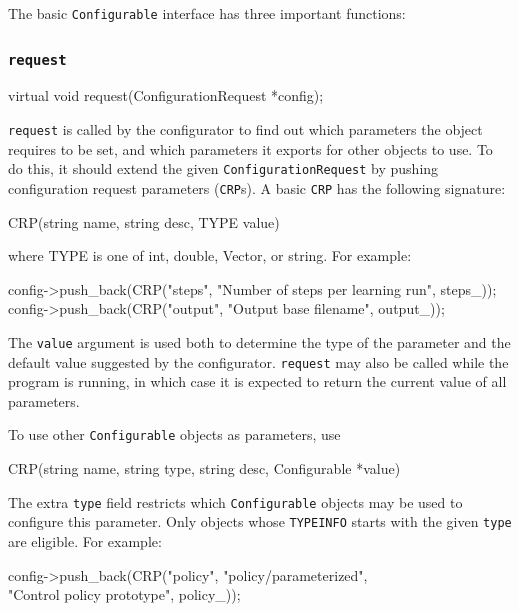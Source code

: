 \documentclass{article}
\newcommand{\txt}[1]{\texttt{#1}}
\newenvironment{code}{\alltt}{\endalltt}
\begin{document}
The basic \txt{Configurable} interface has three important functions:

\subsubsection{\txt{request}}
\begin{code}
virtual void request(ConfigurationRequest *config);
\end{code}

\txt{request} is called by the configurator to find out which parameters the
object requires to be set, and which parameters it exports for other objects
to use. To do this, it should extend the given \txt{ConfigurationRequest}
by pushing configuration request parameters (\txt{CRP}s). A basic \txt{CRP}
has the following signature:

\begin{code}
CRP(string name, string desc, TYPE value)
\end{code}

where TYPE is one of int, double, Vector, or string. For example:

\begin{code}
config->push_back(CRP("steps", "Number of steps per learning run", steps_));
config->push_back(CRP("output", "Output base filename", output_));
\end{code}

The \txt{value} argument is used both to determine the type of the parameter
and the default value suggested by the configurator. \txt{request} may also
be called while the program is running, in which case it is expected to
return the current value of all parameters.

To use other \txt{Configurable} objects as parameters, use

\begin{code}
CRP(string name, string type, string desc, Configurable *value)
\end{code}

The extra \txt{type} field restricts which \txt{Configurable} objects may
be used to configure this parameter. Only objects whose \txt{TYPEINFO}
starts with the given \txt{type} are eligible. For example:

\begin{code}
config->push_back(CRP("policy", "policy/parameterized",\\
                      "Control policy prototype", policy_));
\end{code}
\end{document}
